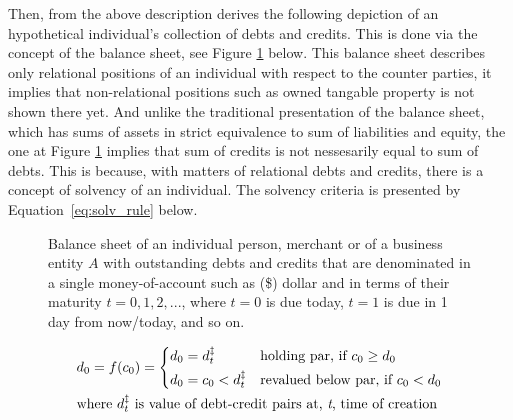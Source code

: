 Then, from the above description derives the following depiction of an hypothetical individual's collection of debts and credits. This is done via the concept of the balance sheet, see Figure \ref{fig:bs1} below. This balance sheet describes only relational positions of an individual with respect to the counter parties, it implies that non-relational positions such as owned tangable property is not shown there yet. And unlike the traditional presentation of the balance sheet, which has sums of assets in strict equivalence to sum of liabilities and equity, the one at Figure \ref{fig:bs1} implies that sum of credits is not nessesarily equal to sum of debts. This is because, with matters of relational debts and credits, there is a concept of solvency of an individual. The solvency criteria is presented by Equation~\ref{eq:solv_rule} below.
 
\begin{figure}[!ht]
\hspace{.3in}
\captionsetup{width=.8\linewidth,labelfont=bf}
  \centering
  \caption[A balance sheet of an individual $A$ as collection of debts and credits]%
  {Balance sheet of an individual person, merchant or of a business entity $A$ with outstanding debts and credits that are denominated in a single money-of-account such as (\$) dollar and in terms of their maturity $t=0,1,2,...$, where $t=0$ is due today, $t=1$ is due in 1 day from now/today, and so on.}
  \label{fig:bs1}
\end{figure}

\begin{equation}\label{eq:solv_rule}
\begin{split}
    & d_0=f(c_0)= 
    \begin{dcases}
    d_0=d^{\ddag}_t & \text{holding par, if } c_0 \geq d_0 \\
    d_0=c_0<d^{\ddag}_t & \text{revalued below par, if } c_0 < d_0 \\
    \end{dcases} \\
    & \text{where } d^{\ddag}_t \text{ is value of debt-credit pairs at, \textit{t}, time of creation} 
\end{split}
\end{equation}

